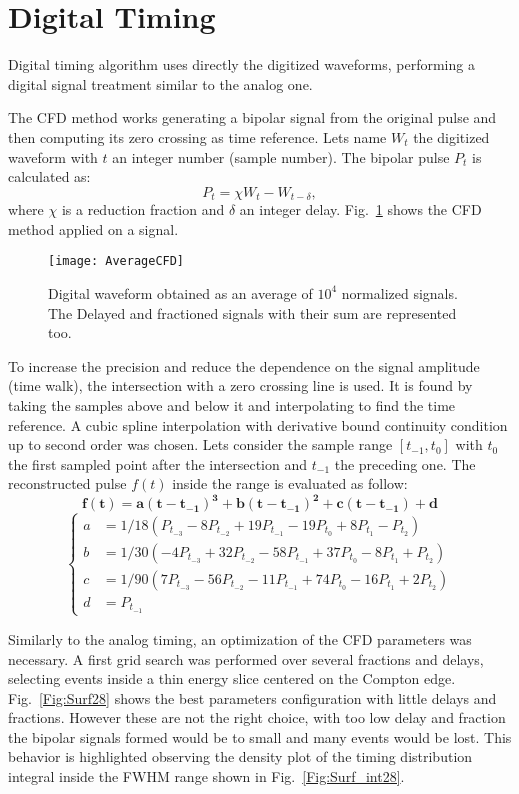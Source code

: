 \section*{Digital Timing}
Digital timing algorithm uses directly the digitized waveforms, performing a digital signal treatment similar to the analog one.
 
The CFD method works generating a bipolar signal from the original pulse and then computing its zero crossing as time reference. Lets name $W_t$ the digitized waveform with $t$ an integer number (sample number). The bipolar pulse $P_t$ is calculated as:
\begin{equation}
P_t=\chi W_t-W_{t-\delta},
\label{eq:bipolarCFD}
\end{equation}
where $\chi$ is a reduction fraction and $\delta$ an integer delay.  Fig.~\ref{Fig:DigitalCFD} shows the CFD method applied on a signal. 
\begin{figure}[h!]
	\centering
	\texttt{[image: AverageCFD]}
	\caption{Digital waveform obtained as an average of $10^4$ normalized signals. The Delayed and fractioned signals with their sum are represented too. }
	\label{Fig:DigitalCFD}
\end{figure}

\newpage
To increase the precision and reduce the dependence on the signal amplitude (time walk), the intersection with a zero crossing line is used. It is found by taking the samples above and below  it  and interpolating to find the time reference. 
A cubic spline interpolation with derivative bound continuity condition up to second order was chosen.
Lets consider the sample range $[t_{-1},t_{0}]$ with $t_{0}$ the first sampled point after the intersection and $t_{-1}$ the preceding one. The reconstructed pulse $f(t)$ inside the range is evaluated as follow:\\
\[\mathbf{f(t)=a (t-t_{-1})^3+b (t-t_{-1})^2+c (t-t_{-1})+d}\]
\[
\left\{
\begin{aligned}
a &=1/18 (P_{t_{-3}}-8 P_{t_{-2}}+19 P_{t_{-1}}-19 P_{t_{0}}+8 P_{t_{1}}-P_{t_{2}})\\
b &=1/30 (-4 P_{t_{-3}}+32 P_{t_{-2}}-58 P_{t_{-1}}+37 P_{t_{0}}-8 P_{t_{1}}+ P_{t_{2}})\\
c &=1/90 (7 P_{t_{-3}}-56 P_{t_{-2}}-11 P_{t_{-1}}+74 P_{t_{0}}-16 P_{t_{1}}+2 P_{t_{2}})\\
d &=P_{t_{-1}}
\end{aligned}
\right.
\]

Similarly to the analog timing, an optimization of the CFD parameters was necessary.  A first grid search was performed over several fractions and delays, selecting events inside a thin energy slice centered on the Compton edge.  Fig.~\ref{Fig:Surf28} shows the best parameters configuration with little delays and fractions. However these are not the right choice, with too low delay and fraction the bipolar signals formed would be to small and many events would be lost. This behavior is highlighted observing the density plot of the timing distribution integral inside the FWHM range shown in Fig.~\ref{Fig:Surf_int28}. 

